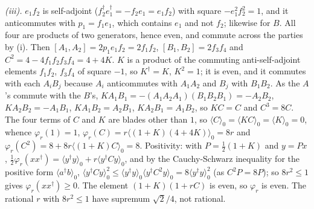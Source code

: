 \emph{(iii).} $e_{1}f_{2}$ is self-adjoint ($f_{2}^{\dagger}e_{1}^{\dagger} = -f_{2}e_{1} = e_{1}f_{2}$) with square $-e_{1}^{2}f_{2}^{2} = 1$, and it anticommutes with $p_{1} = f_{1}e_{1}$, which contains $e_{1}$ and not $f_{2}$; likewise for $B$. All four are products of two generators, hence even, and commute across the parties by (i). Then $[A_{1},A_{2}] = 2p_{1}e_{1}f_{2} = 2f_{1}f_{2}$, $[B_{1},B_{2}] = 2f_{3}f_{4}$ and $C^{2} = 4 - 4f_{1}f_{2}f_{3}f_{4} = 4 + 4K$. $K$ is a product of the commuting anti-self-adjoint elements $f_{1}f_{2}$, $f_{3}f_{4}$ of square $-1$, so $K^{\dagger} = K$, $K^{2} = 1$; it is even, and it commutes with each $A_{i}B_{j}$ because $A_{i}$ anticommutes with $A_{1}A_{2}$ and $B_{j}$ with $B_{1}B_{2}$. As the $A$'s commute with the $B$'s, $KA_{1}B_{1} = -(A_{1}A_{2}A_{1})(B_{1}B_{2}B_{1}) = -A_{2}B_{2}$, $KA_{2}B_{2} = -A_{1}B_{1}$, $KA_{1}B_{2} = A_{2}B_{1}$, $KA_{2}B_{1} = A_{1}B_{2}$, so $KC = C$ and $C^{3} = 8C$. The four terms of $C$ and $K$ are blades other than $1$, so $\langle C\rangle_{0} = \langle KC\rangle_{0} = \langle K\rangle_{0} = 0$, whence $\varphi_{r}(1) = 1$, $\varphi_{r}(C) = r\langle(1 + K)(4 + 4K)\rangle_{0} = 8r$ and $\varphi_{r}(C^{2}) = 8 + 8r\langle(1 + K)C\rangle_{0} = 8$. Positivity: with $P = \tfrac12(1 + K)$ and $y = Px$, $\tfrac12\varphi_{r}(xx^{\dagger}) = \langle y^{\dagger}y\rangle_{0} + r\langle y^{\dagger}Cy\rangle_{0}$, and by the Cauchy-Schwarz inequality for the positive form $\langle a^{\dagger}b\rangle_{0}$, $\langle y^{\dagger}Cy\rangle_{0}^{2} \le \langle y^{\dagger}y\rangle_{0}\langle y^{\dagger}C^{2}y\rangle_{0} = 8\langle y^{\dagger}y\rangle_{0}^{2}$ (as $C^{2}P = 8P$); so $8r^{2} \le 1$ gives $\varphi_{r}(xx^{\dagger}) \ge 0$. The element $(1 + K)(1 + rC)$ is even, so $\varphi_{r}$ is even. The rational $r$ with $8r^{2} \le 1$ have supremum $\sqrt{2}/4$, not rational.


